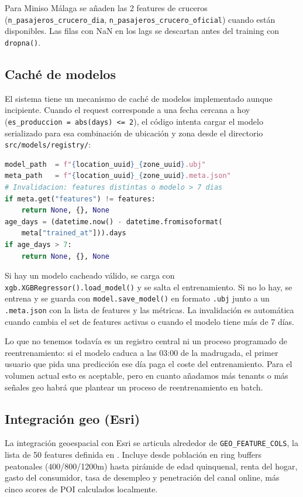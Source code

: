 \documentclass[12pt, a4paper]{article}
\begin{document}
Para Miniso Málaga se añaden las 2 features de cruceros (\texttt{n\_pasajeros\_crucero\_dia}, \texttt{n\_pasajeros\_crucero\_oficial}) cuando están disponibles. Las filas con NaN en los lags se descartan antes del training con \texttt{dropna()}.

\subsection{Caché de modelos}

El sistema tiene un mecanismo de caché de modelos implementado aunque incipiente. Cuando el request corresponde a una fecha cercana a hoy (\texttt{es\_produccion = abs(days) <= 2}), el código intenta cargar el modelo serializado para esa combinación de ubicación y zona desde el directorio \texttt{src/models/registry/}:

\begin{lstlisting}[language=Python]
model_path  = f"{location_uuid}_{zone_uuid}.ubj"
meta_path   = f"{location_uuid}_{zone_uuid}.meta.json"
# Invalidacion: features distintas o modelo > 7 dias
if meta.get("features") != features:
    return None, {}, None
age_days = (datetime.now() - datetime.fromisoformat(
    meta["trained_at"])).days
if age_days > 7:
    return None, {}, None
\end{lstlisting}

Si hay un modelo cacheado válido, se carga con \texttt{xgb.XGBRegressor().load\_model()} y se salta el entrenamiento. Si no lo hay, se entrena y se guarda con \texttt{model.save\_model()} en formato \texttt{.ubj} junto a un \texttt{.meta.json} con la lista de features y las métricas. La invalidación es automática cuando cambia el set de features activas o cuando el modelo tiene más de 7 días.

Lo que no tenemos todavía es un registro central ni un proceso programado de reentrenamiento: si el modelo caduca a las 03:00 de la madrugada, el primer usuario que pida una predicción ese día paga el coste del entrenamiento. Para el volumen actual esto es aceptable, pero en cuanto añadamos más tenants o más señales geo habrá que plantear un proceso de reentrenamiento en batch.

\subsection{Integración geo (Esri)}

La integración geoespacial con Esri se articula alrededor de \texttt{GEO\_FEATURE\_COLS}, la lista de 50 features definida en . Incluye desde población en ring buffers peatonales (400/800/1200m) hasta pirámide de edad quinquenal, renta del hogar, gasto del consumidor, tasa de desempleo y penetración del canal online, más cinco scores de POI calculados localmente.
\end{document}
